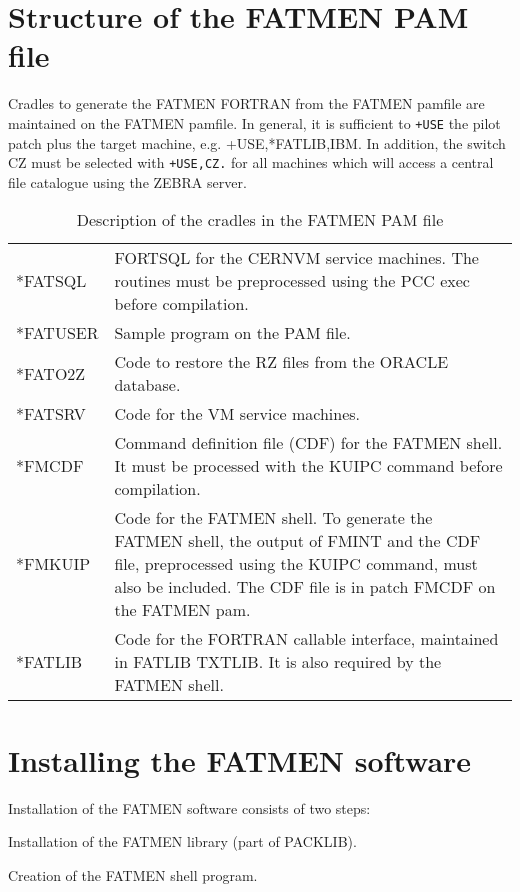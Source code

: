 \section{Structure of the FATMEN PAM file}
\par
Cradles to generate the FATMEN FORTRAN from the FATMEN pamfile are
maintained on the FATMEN pamfile. In general, it is sufficient to
{\tt +USE} the pilot patch plus the target machine,
e.g. +USE,*FATLIB,IBM. In addition, the switch CZ must be selected
with {\tt +USE,CZ.} for all machines which will access
a central file catalogue using the ZEBRA server.
\begin{table}[h]
\caption{Description of the cradles in the FATMEN PAM file}
\begin{center} \begin{tabular}{|l|p{.8\linewidth}|}
\hline
*FATSQL   &FORTSQL for the CERNVM service machines.
          The routines must be preprocessed using the PCC exec before 
         compilation.\\
*FATUSER &Sample program on the PAM file. \\
*FATO2Z  &Code to restore the RZ files from the ORACLE database. \\
*FATSRV  &Code for the VM service machines. \\
*FMCDF   &Command definition file (CDF) for the FATMEN shell.
         It must be processed with the KUIPC command before 
         compilation.\\
*FMKUIP  &Code for the FATMEN shell.
          To generate the FATMEN shell, the output of FMINT and 
          the CDF file,
          preprocessed using the KUIPC command, must also be included.
          The CDF file is in patch
          FMCDF on the FATMEN pam.\\
*FATLIB  &Code for the FORTRAN callable interface, maintained in FATLIB TXTLIB.
          It is also required by the FATMEN shell.  \\
\hline
\end{tabular} \end{center}\end{table}
\section{Installing the FATMEN software}
\par
Installation of the FATMEN software consists of two steps:
\begin{OL}
\item
Installation of the FATMEN library (part of PACKLIB).
\item
Creation of the FATMEN shell program.
\end{OL}
